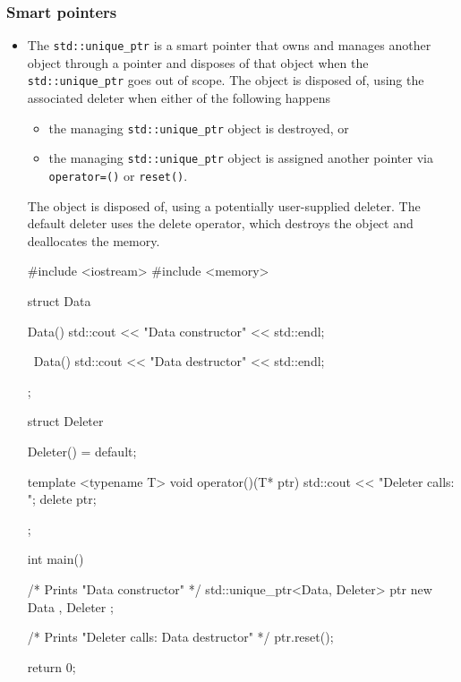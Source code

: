 \documentclass[../main]{subfiles}
\begin{document}
\subsubsection{Smart pointers}
\begin{itemize}
    \item The \texttt{std::unique\_ptr} is a smart pointer that owns and manages another object through a pointer and disposes of that object when the \texttt{std::unique\_ptr} goes out of scope.
    The object is disposed of, using the associated deleter when either of the following happens
    \begin{itemize}
        \item the managing \texttt{std::unique\_ptr} object is destroyed, or
        \item the managing \texttt{std::unique\_ptr} object is assigned another pointer via \texttt{operator=()} or \texttt{reset()}.
    \end{itemize}
    The object is disposed of, using a potentially user-supplied deleter. The default deleter uses the delete operator, which destroys the object and deallocates the memory.
    \begin{Code}
        #include <iostream>
        #include <memory>
        
        struct Data
        {
            Data()
            {
                std::cout << "Data constructor" << std::endl;
            }
            
            ~Data()
            {
                std::cout << "Data destructor" << std::endl;
            }
        };
        
        struct Deleter
        {
            Deleter() = default;
            
            template <typename T>
            void operator()(T* ptr)
            {
                std::cout << "Deleter calls: ";
                delete ptr;
            }
        };
        
        int main()
        {
            /* Prints "Data constructor" */
            std::unique_ptr<Data, Deleter> ptr { new Data {}, Deleter {} };
            
            /* Prints "Deleter calls: Data destructor" */
            ptr.reset();
            
            return 0;
        }
    \end{Code}
    

\end{itemize}
\end{document}
